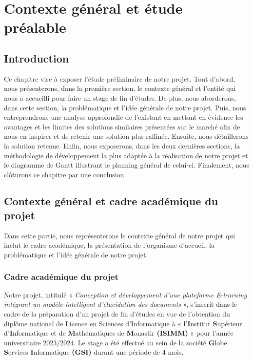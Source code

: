 \vfill 
\chapter{Contexte général et étude préalable}
\label{chap:etude-preliminaire}
\mtcaddchapter
{}
\newcommand{\oui}{\textcolor{vert}{Oui}}
\newcommand{\non}{\textcolor{rouge}{Non}}

\section*{Introduction}
\justifying
Ce chapitre vise à exposer l'étude préliminaire de notre projet. Tout d’abord, nous présenterons, dans la première section, le contexte général et l’entité qui nous a accueilli pour faire un stage de fin d'études. De plus, nous aborderons, dans cette section, la problématique et l'idée générale de notre projet. Puis, nous entreprendrons une analyse approfondie de l'existant en mettant en évidence les avantages et les limites des solutions similaires présentées sur le marché afin de nous en inspirer et de retenir une solution plus raffinée. Ensuite, nous détaillerons la solution retenue. Enfin, nous exposerons, dans les deux dernières sections, la méthodologie de développement la plus adaptée à la réalisation de notre projet et le diagramme de Gantt illustrant le planning général de celui-ci. Finalement, nous clôturons ce chapitre par une conclusion.
\section{Contexte général et cadre académique du projet}
\justifying
Dans cette partie, nous représenterons le contexte général de notre projet qui inclut le cadre académique, la présentation de l’organisme d’accueil, la problématique et l’idée générale de notre projet.

\subsection{Cadre académique du projet}
Notre projet, intitulé « \textit{Conception et développement d’une plateforme E-learning intégrant un modèle intelligent d’élucidation des documents} », s’inscrit dans le cadre de la préparation d’un projet de fin d’études en vue de l’obtention du diplôme national de Licence en Sciences d’Informatique à  « l’\textbf{I}nstitut \textbf{S}upérieur d’\textbf{I}nformatique et de \textbf{M}athématiques de \textbf{M}onastir \textbf{(ISIMM)} » pour l’année universitaire 2023/2024. Le stage a été effectué au sein de la société \textbf{G}lobe \textbf{S}ervices \textbf{I}nformatique \textbf{(GSI)} durant une période de 4 mois.

